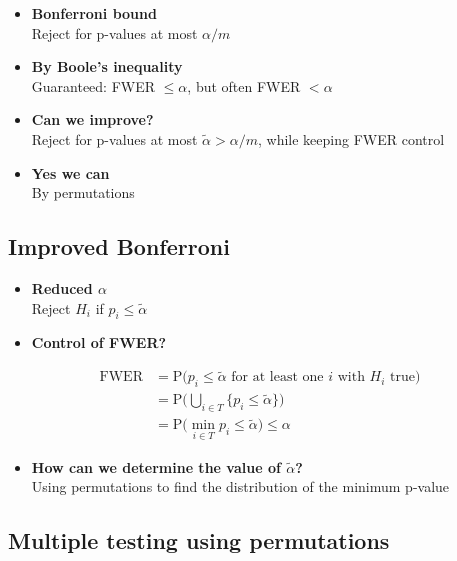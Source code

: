 \documentclass[
]{article}
\providecommand{\tightlist}{%
  \setlength{\itemsep}{0pt}\setlength{\parskip}{0pt}}
\begin{document}
\begin{itemize}
\tightlist
\item
  \textbf{Bonferroni bound}\\
  Reject for p-values at most \(\alpha/m\)\\
\item
  \textbf{By Boole's inequality}\\
  Guaranteed: FWER \(\leq \alpha\), but often FWER \(<\alpha\)\\
\item
  \textbf{Can we improve?}\\
  Reject for p-values at most \(\tilde\alpha > \alpha/m\), while keeping
  FWER control\\
\item
  \textbf{Yes we can}\\
  By permutations
\end{itemize}

\hypertarget{improved-bonferroni}{%
\subsection{Improved Bonferroni}\label{improved-bonferroni}}

\begin{itemize}
\tightlist
\item
  \textbf{Reduced \(\alpha\)}\\
  Reject \(H_i\) if \(p_i \leq \tilde\alpha\)
\item
  \textbf{Control of FWER?}
\end{itemize}

\[
\begin{aligned}
\mathrm{FWER} &= \mathrm{P} \big(\textrm{$p_i \leq \tilde\alpha$ for at least one $i$ with $H_i$ true} \big) \\
    &= \mathrm{P} \Big( \bigcup_{i\in T} \{p_i \leq \tilde\alpha\} \Big) \\
    &= \mathrm{P} \Big( \min_{i \in T} p_i \leq \tilde\alpha \Big) \leq \alpha
\end{aligned}
\]

\begin{itemize}
\tightlist
\item
  \textbf{How can we determine the value of \(\tilde \alpha\)?}\\
  Using permutations to find the distribution of the minimum p-value
\end{itemize}

\hypertarget{multiple-testing-using-permutations}{%
\subsection{Multiple testing using
permutations}\label{multiple-testing-using-permutations}}
\end{document}
